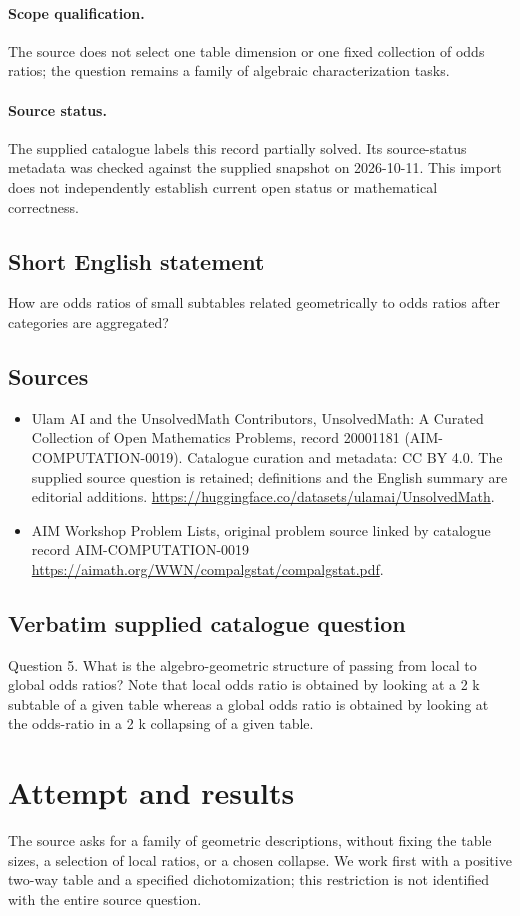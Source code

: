 \documentclass[11pt]{article}
\begin{document}
\paragraph{Scope qualification.}
The source does not select one table dimension or one fixed collection of odds ratios; the question remains a family of algebraic characterization tasks.
\paragraph{Source status.}
The supplied catalogue labels this record partially solved. Its source-status metadata was checked against the supplied snapshot on 2026-10-11. This import does not independently establish current open status or mathematical correctness.
\subsection{Short English statement}
How are odds ratios of small subtables related geometrically to odds ratios after categories are aggregated?
\subsection{Sources}
\begin{itemize}
\item[S1] Ulam AI and the UnsolvedMath Contributors, UnsolvedMath: A Curated Collection of Open Mathematics Problems, record 20001181 (AIM-COMPUTATION-0019). Catalogue curation and metadata: CC BY 4.0. The supplied source question is retained; definitions and the English summary are editorial additions.
\url{https://huggingface.co/datasets/ulamai/UnsolvedMath}.
\item[S2] AIM Workshop Problem Lists, original problem source linked by catalogue record AIM-COMPUTATION-0019
\url{https://aimath.org/WWN/compalgstat/compalgstat.pdf}.
\end{itemize}
\subsection{Verbatim supplied catalogue question}
Question 5. What is the algebro-geometric structure of passing from local to global odds ratios? Note that local odds ratio is obtained by looking at a 2 k subtable of a given table whereas a global odds ratio is obtained by looking at the odds-ratio in a 2 k collapsing of a given table.

\section{Attempt and results}
The source asks for a family of geometric descriptions, without fixing
the table sizes, a selection of local ratios, or a chosen collapse. We
work first with a positive two-way table and a specified dichotomization;
this restriction is not identified with the entire source question.
\end{document}
